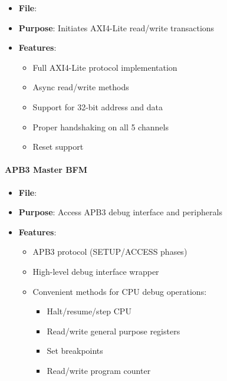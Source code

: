 \begin{record}

\begin{itemize}
\tightlist
\item
  \textbf{File}: 
\item
  \textbf{Purpose}: Initiates AXI4-Lite read/\allowbreak{}write
  transactions
\item
  \textbf{Features}:

  \begin{itemize}
  \tightlist
  \item
    Full AXI4-Lite protocol implementation
  \item
    Async read/\allowbreak{}write methods
  \item
    Support for 32-bit address and data
  \item
    Proper handshaking on all 5 channels
  \item
    Reset support
  \end{itemize}
\end{itemize}

\end{record}

\paragraph{APB3 Master BFM}\label{cr:app:archive-cocotb-setup-summary:apb3-master-bfm}

\begin{record}

\begin{itemize}
\tightlist
\item
  \textbf{File}: 
\item
  \textbf{Purpose}: Access APB3 debug interface and peripherals
\item
  \textbf{Features}:

  \begin{itemize}
  \tightlist
  \item
    APB3 protocol (SETUP/\allowbreak{}ACCESS phases)
  \item
    High-level debug interface wrapper
  \item
    Convenient methods for CPU debug operations:

    \begin{itemize}
    \tightlist
    \item
      Halt/\allowbreak{}resume/\allowbreak{}step CPU
    \item
      Read/\allowbreak{}write general purpose registers
    \item
      Set breakpoints
    \item
      Read/\allowbreak{}write program counter
    \end{itemize}
  \end{itemize}
\end{itemize}

\end{record}

